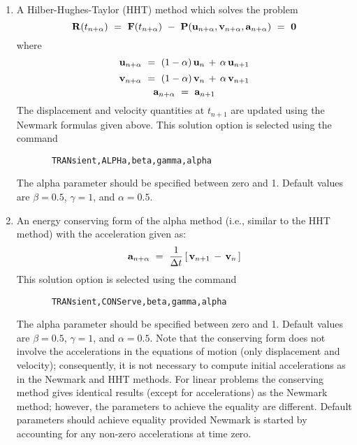 \begin{enumerate}
\item
{A Hilber-Hughes-Taylor (HHT) method \cite{hht77} which solves the problem
\begin{equation}
\mathbf{R} (t_{n+\alpha}) ~=~ \mathbf{F}(t_{n+\alpha})
~-~ \mathbf{P}( \mathbf{u}_{n+\alpha} , \mathbf{v}_{n+\alpha} , \mathbf{a}_{n+\alpha}) ~=~ {\bf 0}
\end{equation}
where
\begin{equation}
\mathbf{u}_{n+\alpha} ~=~ (1 - \alpha) \, \mathbf{u}_n \,+\, \alpha \, \mathbf{u}_{n+1}
\end{equation}
\begin{equation}
\mathbf{v}_{n+\alpha} ~=~ (1 - \alpha) \, \mathbf{v}_n \,+\, \alpha \, \mathbf{v}_{n+1}
\end{equation}
\begin{equation}
\mathbf{a}_{n+\alpha} ~=~ \mathbf{a}_{n+1}
\end{equation}
The displacement and velocity quantities at $t_{n+1}$ are updated using
the Newmark formulas given above.  This solution option is selected
using the command
\begin{verbatim}
       TRANsient,ALPHa,beta,gamma,alpha
\end{verbatim}
The alpha parameter should be specified between zero and 1.
Default values are $\beta = 0.5$, $\gamma = 1$, and $\alpha = 0.5$.}

\item
{An energy conserving form of the alpha
method \cite{simoem92a,simoem92b,gonz96} (i.e., similar to the
HHT method) with the acceleration given as:
\begin{equation}
{\mathbf{a}_{n+\alpha}} ~=~
\frac{1}{\Delta t} \,[\, \mathbf{v}_{n+1} \,-\, \mathbf{v}_n \,]
\end{equation}
This solution option is selected using the command
\begin{verbatim}
       TRANsient,CONServe,beta,gamma,alpha
\end{verbatim}
The alpha parameter should be specified between zero and 1.
Default values are $\beta = 0.5$, $\gamma = 1$, and $\alpha = 0.5$.
Note that the conserving form does not involve the accelerations
in the equations of motion (only displacement and
velocity); consequently, it is not necessary to compute initial accelerations
as in the Newmark and HHT methods.  For linear problems the conserving method
gives identical results (except for accelerations) as the Newmark method;
however, the parameters to achieve the equality are different.  Default
parameters should achieve equality provided Newmark is started by accounting
for any non-zero accelerations at time zero.}


\end{enumerate}
